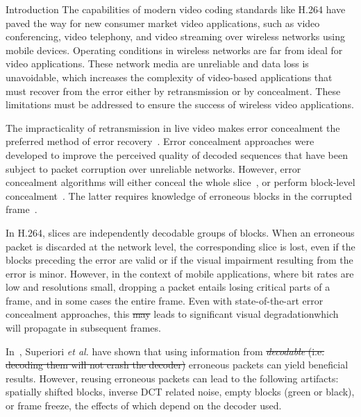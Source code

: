 \documentclass{article}
\providecommand{\DIFaddtex}[1]{{\protect\color{blue}\uwave{#1}}} %
\providecommand{\DIFdeltex}[1]{{\protect\color{red}\sout{#1}}}                      %
\providecommand{\DIFaddbegin}{} %
\providecommand{\DIFaddend}{} %
\providecommand{\DIFdelbegin}{} %
\providecommand{\DIFdelend}{} %
\providecommand{\DIFadd}[1]{\texorpdfstring{\DIFaddtex{#1}}{#1}} %
\providecommand{\DIFdel}[1]{\texorpdfstring{\DIFdeltex{#1}}{}} %
\begin{document}
\DIFaddbegin \vspace{-0.5em}\DIFaddend \begin{section}{Introduction}
\label{section-introduction}
The capabilities of modern video coding standards like H.264 have paved the
way for new consumer market video applications, such as video conferencing,
video telephony, and video streaming over wireless networks using mobile
devices. Operating conditions in wireless networks are far from ideal for
video applications. These network media are unreliable and data loss is
unavoidable, which increases the complexity of video-based applications
that must recover from the error either by retransmission or by
concealment. These limitations must be addressed to ensure the success of
wireless video applications.

The impracticality of retransmission in live video makes error
concealment the preferred method of error recovery~\cite{Wang1998}. Error
concealment approaches were developed to improve the perceived quality of
decoded sequences that have been subject to packet corruption over
unreliable networks. However, error concealment algorithms will either
conceal the whole slice~\cite{Wu-ISCAS-2006}, or perform block-level
concealment~\cite{OBMA}. The latter requires knowledge of erroneous blocks
in the corrupted frame~\cite{Wang1998}.

In H.264, slices are independently decodable groups of blocks. When an erroneous
packet is discarded at the network level, the corresponding slice is lost, even
if the blocks preceding the error are valid or if the visual impairment
resulting from the error is minor. However, in the context of mobile
applications, where bit rates are low and resolutions small, dropping a packet
entails losing critical parts of a frame, and in some cases the entire frame.
Even with state-of-the-art error concealment approaches, this \DIFdelbegin \DIFdel{may }\DIFdelend leads to 
significant visual degradation\DIFaddbegin \DIFadd{, }\DIFaddend which will propagate in subsequent frames.

In~\cite{Superiori2007}, Superiori \textit{et al.} have shown that using
information from \DIFdelbegin \DIFdel{\emph{decodable} (i.e. decoding them will not crash the 
decoder)
}\DIFdelend \DIFaddbegin \DIFadd{decodable }\DIFaddend erroneous packets can yield beneficial results.
However, reusing erroneous packets can lead to the following artifacts:
spatially shifted blocks, inverse DCT related noise, empty blocks (green or
black), or frame freeze, the effects of which depend on the decoder used.


\end{section}
\end{document}
